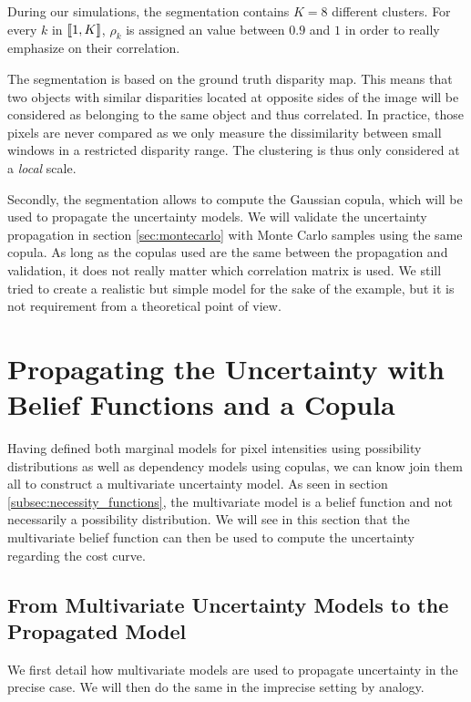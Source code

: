 During our simulations, the segmentation contains $K=8$ different clusters. For every $k$ in ${[\![}1,K{]\!]}$, $\rho_k$ is assigned an value between $0.9$ and $1$ in order to really emphasize on their correlation.

\begin{remark}
    The segmentation is based on the ground truth disparity map. This means that two objects with similar disparities located at opposite sides of the image will be considered as belonging to the same object and thus correlated. In practice, those pixels are never compared as we only measure the dissimilarity between small windows in a restricted disparity range. The clustering is thus only considered at a \textit{local} scale. 
    
    Secondly, the segmentation allows to compute the Gaussian copula, which will be used to propagate the uncertainty models. We will validate the uncertainty propagation in section \ref{sec:montecarlo} with Monte Carlo samples using the same copula. As long as the copulas used are the same between the propagation and validation, it does not really matter which correlation matrix is used. We still tried to create a realistic but simple model for the sake of the example, but it is not requirement from a theoretical point of view.
\end{remark}

\section{Propagating the Uncertainty with Belief Functions and a Copula}
Having defined both marginal models for pixel intensities using possibility distributions as well as dependency models using copulas, we can know join them all to construct a multivariate uncertainty model. As seen in section \ref{subsec:necessity_functions}, the multivariate model is a belief function and not necessarily a possibility distribution. We will see in this section that the multivariate belief function can then be used to compute the uncertainty regarding the cost curve. 

\subsection{From Multivariate Uncertainty Models to the Propagated Model}
We first detail how multivariate models are used to propagate uncertainty in the precise case. We will then do the same in the imprecise setting by analogy.

